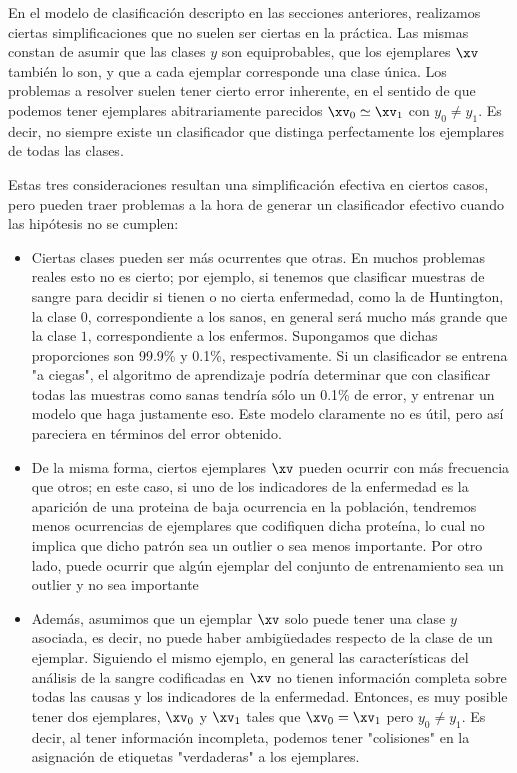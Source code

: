 En el modelo de clasificación descripto en las secciones anteriores, realizamos ciertas simplificaciones que no suelen ser ciertas en la práctica. Las mismas constan de asumir que las clases $y$ son equiprobables, que los ejemplares $\xv$ también lo son, y que a cada ejemplar corresponde una clase única. Los problemas a resolver suelen tener cierto error inherente, en el sentido de que podemos tener ejemplares abitrariamente parecidos $\xv_0 \simeq \xv_1$ con  $y_0 \neq y_1$. Es decir, no siempre existe un clasificador que distinga perfectamente los ejemplares de todas las clases.

Estas tres consideraciones resultan una simplificación efectiva en ciertos casos, pero pueden traer problemas a la hora de generar un clasificador efectivo cuando las hipótesis no se cumplen:
 
\newcommand{\XV}{\mathbf{X}}	
\newcommand{\DP}{P}	
\begin{itemize}

\item Ciertas clases pueden ser más ocurrentes que otras. En muchos problemas reales esto no es cierto; por ejemplo, si tenemos que clasificar muestras de sangre para decidir si tienen o no cierta enfermedad, como la de Huntington, la clase $0$, correspondiente a los sanos, en general será mucho más grande que la clase $1$, correspondiente a los enfermos. Supongamos que dichas proporciones son 99.9\% y 0.1\%, respectivamente. Si un clasificador se entrena "a ciegas", el algoritmo de aprendizaje podría determinar que con clasificar todas las muestras como sanas tendría sólo un 0.1\% de error, y entrenar un modelo que haga justamente eso. Este modelo claramente no es útil, pero así pareciera en términos del error obtenido. 

\item De la misma forma, ciertos ejemplares $\xv$ pueden ocurrir con más frecuencia que otros; en este caso, si uno de los indicadores de la enfermedad es la aparición de una proteina de baja ocurrencia en la población, tendremos menos ocurrencias de ejemplares que codifiquen dicha proteína, lo cual no implica que dicho patrón sea un outlier o sea menos importante. Por otro lado, puede ocurrir que algún ejemplar del conjunto de entrenamiento sea un outlier y no sea importante
 
\item Además, asumimos que un ejemplar $\xv$ solo puede tener una clase $y$ asociada, es decir, no puede haber ambigüedades respecto de la clase de un ejemplar.  Siguiendo el mismo ejemplo, en general las características del análisis de la sangre codificadas en $\xv$ no tienen información completa sobre todas las causas y los indicadores de la enfermedad. Entonces, es muy posible tener dos ejemplares, $\xv_0$ y $\xv_1$ tales que $\xv_0=\xv_1$ pero $y_0 \neq y_1$. Es decir, al tener información incompleta, podemos tener "colisiones" en la asignación de etiquetas "verdaderas" a los ejemplares.

\end{itemize}


